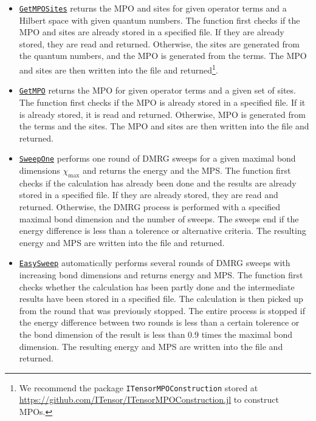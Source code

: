 \documentclass{timesjhep}
\begin{document}
\begin{itemize}
    \item \href{https://docs.fuzzified.world/itensors/\#FuzzifiED.GetMPOSites-Tuple{String,\%20Union{Sum{Scaled{ComplexF64,\%20Prod{Op}}},\%20Vector{Term}},\%20Vector{QNDiag}}}{\lstinline|GetMPOSites|} returns the MPO and sites for given operator terms and a Hilbert space with given quantum numbers. The function first checks if the MPO and sites are already stored in a specified file. If they are already stored, they are read and returned. Otherwise, the sites are generated from the quantum numbers, and the MPO is generated from the terms. The MPO and sites are then written into the file and returned\footnote{We recommend the package \lstinline[basicstyle=\ttfamily\scriptsize]|ITensorMPOConstruction| stored at \url{https://github.com/ITensor/ITensorMPOConstruction.jl} to construct MPOs.}.
    \item \href{https://docs.fuzzified.world/itensors/\#FuzzifiED.GetMPO-Tuple{String,\%20Union{Sum{Scaled{ComplexF64,\%20Prod{Op}}},\%20Vector{Term}},\%20Vector{\%3C:Index}}}{\lstinline|GetMPO|} returns the MPO for given operator terms and a given set of sites. The function first checks if the MPO is already stored in a specified file. If it is already stored, it is read and returned. Otherwise, MPO is generated from the terms and the sites. The MPO and sites are then written into the file and returned.
    \item \href{https://docs.fuzzified.world/itensors/\#FuzzifiED.SweepOne-Tuple{String,\%20MPO,\%20MPS,\%20Int64}}{\lstinline|SweepOne|} performs one round of DMRG sweeps for a given maximal bond dimensions $\chi_{\max}$ and returns the energy and the MPS. The function first checks if the calculation has already been done and the results are already stored in a specified file. If they are already stored, they are read and returned. Otherwise, the DMRG process is performed with a specified maximal bond dimension and the number of sweeps. The sweeps end if the energy difference is less than a tolerence or alternative criteria. The resulting energy and MPS are written into the file and returned.
    \item \href{https://docs.fuzzified.world/itensors/\#FuzzifiED.EasySweep-Tuple{String,\%20MPO,\%20MPS}}{\lstinline|EasySweep|} automatically performs several rounds of DMRG sweeps with increasing bond dimensions and returns energy and MPS. The function first checks whether the calculation has been partly done and the intermediate results have been stored in a specified file. The calculation is then picked up from the round that was previously stopped. The entire process is stopped if the energy difference between two rounds is less than a certain tolerence or the bond dimension of the result is less than $0.9$ times the maximal bond dimension. The resulting energy and MPS are written into the file and returned.
\end{itemize}
\end{document}
